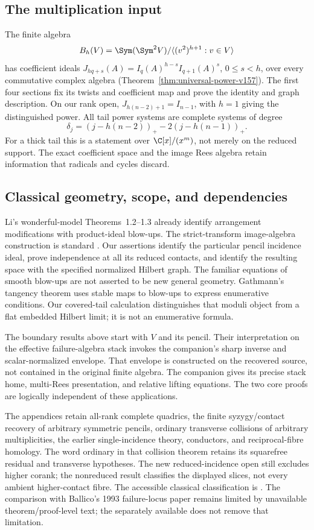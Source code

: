 \subsection{The multiplication input}
The finite algebra
\[
 B_h(V)=\Sym(\Sym^2V)/\langle(v^2)^{h+1}:v\in V\rangle
\]
has coefficient ideals
$J_{hq+s}(A)=I_q(A)^{h-s}I_{q+1}(A)^s$, $0\leq s<h$, over every
commutative complex algebra (Theorem~\ref{thm:universal-power-v157}).
The first four sections fix its twists and coefficient map and
prove the identity and graph description. On our rank open,
$J_{h(n-2)+1}=I_{n-1}$, with $h=1$ giving the distinguished power.
All tail power systems are complete systems of degree
\[
 \delta_j=(j-h(n-2))_+-2(j-h(n-1))_+.
\]
For a thick tail this is a statement over $\C[x]/(x^m)$, not merely
on the reduced support. The exact coefficient space and the image
Rees algebra retain information that radicals and cycles discard.

\subsection{Classical geometry, scope, and dependencies}
Li's wonderful-model Theorems~1.2--1.3 \cite{Li2009v161} already
identify arrangement modifications with product-ideal blow-ups.
The strict-transform image-algebra construction is standard
\cite[Tag~080C]{Stacks161}. Our assertions identify the particular
pencil incidence ideal, prove independence at all its reduced
contacts, and identify the resulting space with the specified
normalized Hilbert graph. The familiar equations of smooth
blow-ups are not asserted to be new general geometry.
Gathmann's tangency theorem \cite[Theorem~7.1]{Gathmann1998v161}
uses stable maps to blow-ups to express enumerative conditions. Our
covered-tail calculation distinguishes that moduli object from a
flat embedded Hilbert limit; it is not an enumerative formula.

The boundary results above start with $V$ and its pencil. Their
interpretation on the effective failure-algebra stack invokes the
companion's sharp inverse and scalar-normalized envelope. That
envelope is constructed on the recovered source, not contained in
the original finite algebra. The companion gives its precise stack
home, multi-Rees presentation, and relative lifting equations.
The two core proofs are logically independent of these applications.

The appendices retain all-rank complete quadrics, the finite
syzygy/contact recovery of arbitrary symmetric pencils, ordinary
transverse collisions of arbitrary multiplicities, the earlier
single-incidence theory, conductors, and reciprocal-fibre homology.
The word ordinary in that collision theorem retains its squarefree
residual and transverse hypotheses. The new reduced-incidence
open still excludes higher corank; the nonreduced result classifies
the displayed slices, not every ambient higher-contact fibre.
The accessible classical classification is
\cite[Theorem~2.1]{DeTeranDmytryshynDopico2018v161}. The comparison
with Ballico's 1993 failure-locus paper \cite{Ballico93} remains
limited by unavailable theorem/proof-level text; the separately
available \cite{Ballico1996v161} does not remove that limitation.

